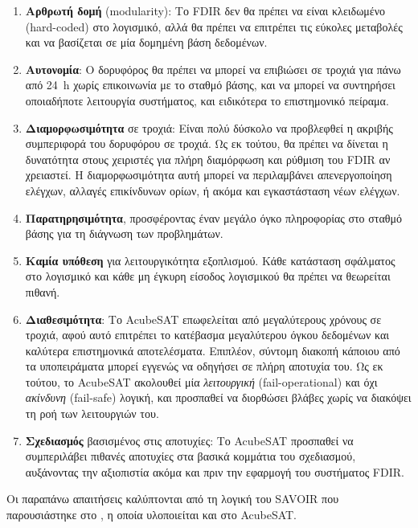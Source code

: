 \documentclass[a4paper,nobib]{tufte-book}
\begin{document}
\begin{enumerate}
	\item \textbf{Αρθρωτή δομή} (modularity): Το \acs{FDIR} δεν θα πρέπει να είναι κλειδωμένο (hard-coded) στο λογισμικό, αλλά θα πρέπει να επιτρέπει τις εύκολες μεταβολές και να βασίζεται σε μία δομημένη βάση δεδομένων.
	\item \textbf{Αυτονομία}: Ο δορυφόρος θα πρέπει να μπορεί να επιβιώσει σε τροχιά για πάνω από \SI{24}{\hour} χωρίς επικοινωνία με το σταθμό βάσης, και να μπορεί να συντηρήσει οποιαδήποτε λειτουργία συστήματος, και ειδικότερα το επιστημονικό πείραμα.
	\item \textbf{Διαμορφωσιμότητα} σε τροχιά: Είναι πολύ δύσκολο να προβλεφθεί η ακριβής συμπεριφορά του δορυφόρου σε τροχιά. Ως εκ τούτου, θα πρέπει να δίνεται η δυνατότητα στους χειριστές για πλήρη διαμόρφωση και ρύθμιση του \acs{FDIR} αν χρειαστεί. Η διαμορφωσιμότητα αυτή μπορεί να περιλαμβάνει απενεργοποίηση ελέγχων, αλλαγές επικίνδυνων ορίων, ή ακόμα και εγκαστάσταση νέων ελέγχων.
	\item \textbf{Παρατηρησιμότητα}, προσφέροντας έναν μεγάλο όγκο πληροφορίας στο σταθμό βάσης για τη διάγνωση των προβλημάτων.
	\item \textbf{Καμία υπόθεση} για λειτουργικότητα εξοπλισμού. Κάθε κατάσταση σφάλματος στο λογισμικό και κάθε μη έγκυρη είσοδος λογισμικού θα πρέπει να θεωρείται πιθανή.
	\item \textbf{Διαθεσιμότητα}: Το AcubeSAT επωφελείται από μεγαλύτερους χρόνους σε τροχιά, αφού αυτό επιτρέπει το κατέβασμα μεγαλύτερου όγκου δεδομένων και καλύτερα επιστημονικά αποτελέσματα. Επιπλέον, σύντομη διακοπή κάποιου από τα υποπειράματα μπορεί εγγενώς να οδηγήσει σε πλήρη αποτυχία του. Ως εκ τούτου, το AcubeSAT ακολουθεί μία \emph{λειτουργική} (fail-operational) και όχι \emph{ακίνδυνη} (fail-safe) λογική, και προσπαθεί να διορθώσει βλάβες χωρίς να διακόψει τη ροή των λειτουργιών του.
	\item \textbf{Σχεδιασμός} βασισμένος στις αποτυχίες: Το AcubeSAT προσπαθεί να συμπεριλάβει πιθανές αποτυχίες στα βασικά κομμάτια του σχεδιασμού, αυξάνοντας την αξιοπιστία ακόμα και πριν την εφαρμογή του συστήματος \acs{FDIR}.
\end{enumerate}

Οι παραπάνω απαιτήσεις καλύπτονται από τη λογική του \acs{SAVOIR} που παρουσιάστηκε στο , η οποία υλοποιείται και στο AcubeSAT.
\end{document}

